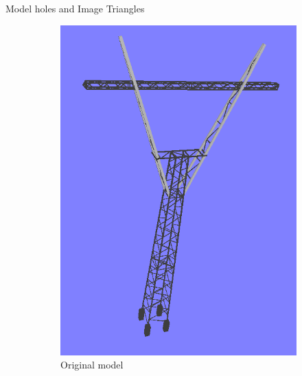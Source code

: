 \documentclass{beamer}
\begin{document}
\begin{frame}[t, fragile]{Model holes and Image Triangles}
\begin{figure}
\centering
\begin{subfigure}{.5\textwidth}
\centering
\includegraphics[scale=0.22]{3d_model}
\caption{Original model}
\end{subfigure}%
\begin{subfigure}{.5\textwidth}

\end{subfigure}
\end{figure}
\end{frame}
\end{document}
